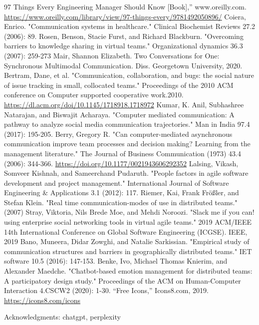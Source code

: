 \documentclass{llncs}
\begin{document}

\begin{thebibliography}{8}
97 Things Every Engineering Manager Should Know [Book],” www.oreilly.com.
\url{https://www.oreilly.com/library/view/97-things-every/9781492050896/}
‌
Coiera, Enrico. "Communication systems in healthcare." Clinical Biochemist Reviews 27.2 (2006): 89.
Rosen, Benson, Stacie Furst, and Richard Blackburn. "Overcoming barriers to knowledge sharing in virtual teams." Organizational dynamics 36.3 (2007): 259-273
Mair, Shannon Elizabeth. Two Conversations for One: Synchronous Multimodal Communication. Diss. Georgetown University, 2020.
Bertram, Dane, et al. "Communication, collaboration, and bugs: the social nature of issue tracking in small, collocated teams." Proceedings of the 2010 ACM conference on Computer supported cooperative work.2010. \url{https://dl.acm.org/doi/10.1145/1718918.1718972}
Kumar, K. Anil, Subhashree Natarajan, and Biswajit Acharaya. "Computer mediated communication: A pathway to analyze social media communication trajectories." Man in India 97.4 (2017): 195-205.
Berry, Gregory R. "Can computer-mediated asynchronous communication improve team processes and decision making? Learning from the management literature." The Journal of Business Communication (1973) 43.4 (2006): 344-366. \url{https://doi.org/10.1177/0021943606292352}
Lalsing, Vikash, Somveer Kishnah, and Sameerchand Pudaruth. "People factors in agile software development and project management." International Journal of Software Engineering \& Applications 3.1 (2012): 117.
Riemer, Kai, Frank Frößler, and Stefan Klein. "Real time communication-modes of use in distributed teams." (2007)
Stray, Viktoria, Nils Brede Moe, and Mehdi Noroozi. "Slack me if you can! using enterprise social networking tools in virtual agile teams." 2019 ACM/IEEE 14th International Conference on Global Software Engineering (ICGSE). IEEE, 2019
Bano, Muneera, Didar Zowghi, and Natalie Sarkissian. "Empirical study of communication structures and barriers in geographically distributed teams." IET software 10.5 (2016): 147-153.
Benke, Ivo, Michael Thomas Knierim, and Alexander Maedche. "Chatbot-based emotion management for distributed teams: A participatory design study." Proceedings of the ACM on Human-Computer Interaction 4.CSCW2 (2020): 1-30.
“Free Icons,” Icons8.com, 2019. \url{https://icons8.com/icons}

Acknowledgments: chatgpt, perplexity
\end{thebibliography}
\end{document}
